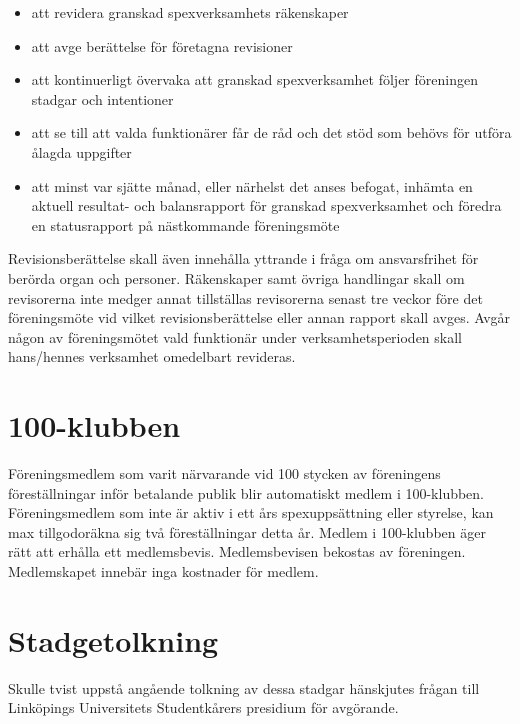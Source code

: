 \documentclass[a4paper]{article}
\begin{document}
\begin{itemize}
  \item att revidera granskad spexverksamhets räkenskaper
  \item att avge berättelse för företagna revisioner
  \item att kontinuerligt övervaka att granskad spexverksamhet följer föreningen stadgar och intentioner
  \item att se till att valda funktionärer får de råd och det stöd som behövs för utföra ålagda uppgifter
  \item att minst var sjätte månad, eller närhelst det anses befogat, inhämta en aktuell resultat- och balansrapport för granskad spexverksamhet och föredra en statusrapport på nästkommande föreningsmöte
\end{itemize}

\noindent
Revisionsberättelse skall även innehålla yttrande i fråga om ansvarsfrihet för berörda organ och personer.\newline
\newline
Räkenskaper samt övriga handlingar skall om revisorerna inte medger annat tillställas revisorerna senast tre veckor före det föreningsmöte vid vilket revisionsberättelse eller annan rapport skall avges.\newline
\newline
Avgår någon av föreningsmötet vald funktionär under verksamhetsperioden skall hans/hennes verksamhet omedelbart revideras.

\section{100-klubben}
\label{section:100-klubben}

Föreningsmedlem som varit närvarande vid 100 stycken av föreningens föreställningar inför betalande publik blir automatiskt medlem i 100-klubben.\newline
\newline
Föreningsmedlem som inte är aktiv i ett års spexuppsättning eller styrelse, kan max tillgodoräkna sig två föreställningar detta år.\newline
\newline
Medlem i 100-klubben äger rätt att erhålla ett medlemsbevis. Medlemsbevisen bekostas av föreningen.\newline
\newline
Medlemskapet innebär inga kostnader för medlem.

\section{Stadgetolkning}
Skulle tvist uppstå angående tolkning av dessa stadgar hänskjutes frågan till Linköpings Universitets Studentkårers presidium för avgörande.
\end{document}
